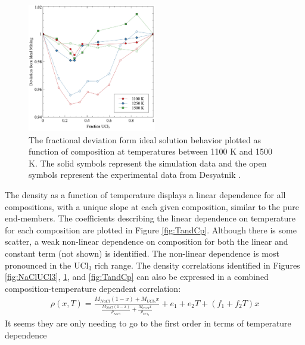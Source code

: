 \documentclass[preprint,3p,10pt,onecolumn,number,sort&compress]{elsarticle}
\begin{document}
\begin{figure}[htb]
\centering
\includegraphics[width=0.5\textwidth]{fig8.jpg}
\caption{The fractional deviation form ideal solution behavior plotted as function of composition at temperatures between 1100 K and 1500 K. The solid symbols represent the simulation data and the open symbols represent the experimental data from Desyatnik \cite{Desyatnik}.}  
\label{fig:ideal}
\end{figure}

The density as a function of temperature displays a linear dependence for all compositions, with a unique slope at each given composition, similar to the pure end-members. The coefficients describing the linear dependence on temperature for each composition are plotted in Figure \ref{fig:TandCp}. Although there is some scatter, a weak non-linear dependence on composition for both the linear and constant term (not shown) is identified. The non-linear dependence is most pronounced in the UCl$_3$ rich range. The density correlations identified in Figures \ref{fig:NaClUCl3}, \ref{fig:ideal}, and \ref{fig:TandCp} can also be expressed in a combined composition-temperature dependent correlation:
\begin{equation}
\begin{split}
\rho(x,T)=\frac{M_{NaCl}(1-x)+M_{UCl_3}x}{\frac{M_{NaCl}(1-x)}{\rho_{NaCl}}+\frac{M_{UCl3}x}{\rho_{UCl_3}}}+ e_1+e_2T+(f_1+f_2T)x 
\label{eq:LS}
\end{split}
\end{equation}
{\color{red} It seems they are only needing to go to the first order in terms of temperature dependence}
\end{document}

